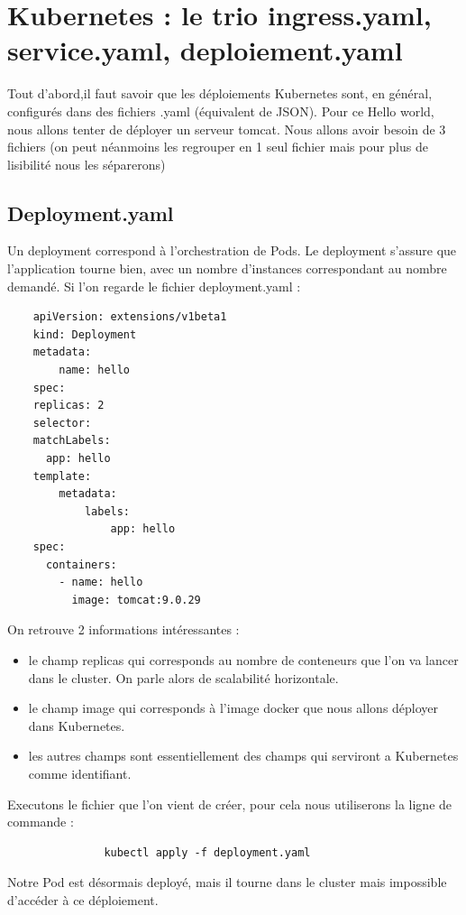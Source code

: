 \documentclass[11pt,fleqn]{book} %
\begin{document}
\section*{Kubernetes : le trio ingress.yaml, service.yaml, deploiement.yaml}

Tout d'abord,il faut savoir que les déploiements Kubernetes sont, en général, configurés dans des fichiers .yaml (équivalent de JSON). Pour ce Hello world, nous allons tenter de déployer un serveur tomcat. Nous allons avoir besoin de 3 fichiers (on peut néanmoins les regrouper en 1 seul fichier mais pour plus de lisibilité nous les séparerons) 

\subsection*{Deployment.yaml}
Un deployment correspond à l'orchestration de Pods. Le deployment s'assure que l'application tourne bien, avec un nombre d'instances correspondant au nombre demandé. Si l'on regarde le fichier deployment.yaml : 
\begin{verbatim}
    apiVersion: extensions/v1beta1
    kind: Deployment
    metadata:
        name: hello
    spec:
    replicas: 2
    selector:
    matchLabels:
      app: hello
    template:
        metadata:
            labels:
                app: hello
    spec:
      containers:
        - name: hello
          image: tomcat:9.0.29
\end{verbatim}

On retrouve 2 informations intéressantes : 
\begin{itemize}
    \item le champ replicas qui corresponds au nombre de conteneurs que l'on va lancer dans le cluster. On parle alors de scalabilité horizontale. 
    \item le champ image qui corresponds à l'image docker que nous allons déployer dans Kubernetes.
    \item les autres champs sont essentiellement des champs qui serviront a Kubernetes comme identifiant.
\end{itemize}
Executons le fichier que l'on vient de créer, pour cela nous utiliserons la ligne de commande :
\begin{verbatim}
               kubectl apply -f deployment.yaml
\end{verbatim}
Notre Pod est désormais deployé, mais il tourne dans le cluster mais impossible d'accéder à ce déploiement. 
\end{document}

